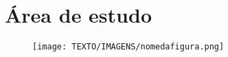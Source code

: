 \chapter{Área de estudo}
\label{cap-areadeestudo}


\begin{figure}[h]
\centering
\texttt{[image: TEXTO/IMAGENS/nomedafigura.png]}
\caption{}
\fonte{}
\end{figure}

